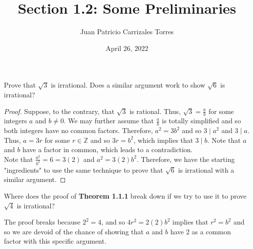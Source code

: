 \documentclass[12pt]{article}
\newcommand{\Z}{\mathbb{Z}}
\newenvironment{problem}[2][Problem]{\begin{trivlist}
		\item[\hskip \labelsep {\bfseries #1}\hskip \labelsep {\bfseries #2.}]}{\end{trivlist}}
\newenvironment{solution}[2][Solution]{\begin{trivlist}
		\item[\hskip \labelsep {\bfseries #1}\hskip \labelsep {\bfseries #2.}]}{\end{trivlist}}
\begin{document}
	
	\title{Section 1.2: Some Preliminaries}
	\author{Juan Patricio Carrizales Torres}
	\date{April 26, 2022}
	\maketitle

	\begin{problem}{1.2.1}
		\begin{enumerate}[label=(\alph*)]
			\item Prove that $\sqrt{3}$ is irrational. Does a similar argument work to show $\sqrt{6}$ is irrational?
			\begin{proof}
				Suppose, to the contrary, that $\sqrt{3}$ is rational. Thus, $\sqrt{3} = \frac{a}{b}$ for some integers $a$ and $b\neq 0$. We may further assume that $\frac{a}{b}$ is totally simplified and so both integers have no common factors. Therefore, $a^{2} = 3b^{2}$ and so $3\mid a^2$ and $3\mid a$. Thus, $a = 3r$ for some $r\in \Z$ and so $3r = b^{2}$, which implies that $3\mid b$. Note that $a$ and $b$ have a factor in common, which leads to a contradiction.	\\
				
				Note that $\frac{a^{2}}{b^{2}} = 6 = 3(2)$ and $a^{2} = 3(2)b^{2}$. Therefore, we have the starting "ingredients" to use the same technique to prove that $\sqrt{6}$ is irrational with a similar argument. 
			\end{proof}
		
			\item Where does the proof of \textbf{Theorem 1.1.1} break down if we try to use it to prove $\sqrt{4}$ is irrational?
			\begin{solution}{(b)}
				The proof breaks because $2^{2} = 4$, and so $4r^{2} = 2(2)b^{2}$ implies that $r^{2} = b^{2}$ and so we are devoid of the chance of showing that $a$ and $b$ have $2$ as a common factor with this specific argument.
			\end{solution}
		\end{enumerate}
	\end{problem}
\end{document}
